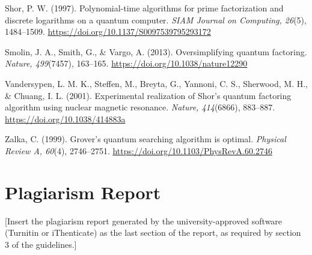 \documentclass[12pt,oneside]{report}
\begin{document}
Shor, P. W. (1997). Polynomial-time algorithms for prime factorization and discrete logarithms on a quantum computer. \textit{SIAM Journal on Computing, 26}(5), 1484–1509. \url{https://doi.org/10.1137/S0097539795293172}
\par

Smolin, J. A., Smith, G., \& Vargo, A. (2013). Oversimplifying quantum factoring. \textit{Nature, 499}(7457), 163–165. \url{https://doi.org/10.1038/nature12290}
\par

Vandersypen, L. M. K., Steffen, M., Breyta, G., Yannoni, C. S., Sherwood, M. H., \& Chuang, I. L. (2001). Experimental realization of Shor's quantum factoring algorithm using nuclear magnetic resonance. \textit{Nature, 414}(6866), 883–887. \url{https://doi.org/10.1038/414883a}
\par

Zalka, C. (1999). Grover's quantum searching algorithm is optimal. \textit{Physical Review A, 60}(4), 2746–2751. \url{https://doi.org/10.1103/PhysRevA.60.2746}
\par

\section*{Plagiarism Report}

[Insert the plagiarism report generated by the university-approved software (Turnitin or iThenticate) as the last section of the report, as required by section 3 of the guidelines.]
\par
\end{document}

